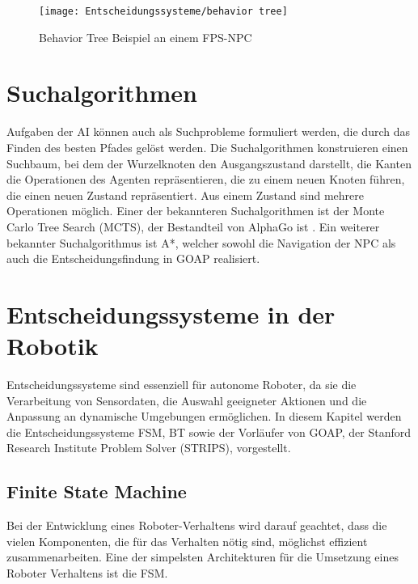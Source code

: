 \begin{figure}[h]
  \centering
  \texttt{[image: Entscheidungssysteme/behavior tree]}
	\captionsetup{justification=justified, format=plain}
  \caption{Behavior Tree Beispiel an einem FPS-NPC}
  \label{fig:ES BT}
\end{figure}


\section{Suchalgorithmen}
\label{chap:monte-carlo}

Aufgaben der AI k\"{o}nnen auch als Suchprobleme formuliert werden, die durch das Finden des besten Pfades gel\"{o}st werden. Die Suchalgorithmen konstruieren einen Suchbaum, bei dem der Wurzelknoten den Ausgangszustand darstellt, die Kanten die Operationen des Agenten repr\"{a}sentieren, die zu einem neuen Knoten f\"{u}hren, die einen neuen Zustand repr\"{a}sentiert. Aus einem Zustand sind mehrere Operationen m\"{o}glich. Einer der bekannteren Suchalgorithmen ist der Monte Carlo Tree Search (MCTS), der Bestandteil von AlphaGo ist \autocite{review_game_ai}. Ein weiterer bekannter Suchalgorithmus ist A*, welcher sowohl die Navigation der NPC als auch die Entscheidungsfindung in GOAP realisiert.

\section{Entscheidungssysteme in der Robotik}
\label{chap:robotik}

Entscheidungssysteme sind essenziell f\"{u}r autonome Roboter, da sie die Verarbeitung von Sensordaten, die Auswahl geeigneter Aktionen und die Anpassung an dynamische Umgebungen erm\"{o}glichen. In diesem Kapitel werden die Entscheidungssysteme FSM, BT sowie der Vorl\"{a}ufer von GOAP, der Stanford Research Institute Problem Solver (STRIPS), vorgestellt.

\subsection{Finite State Machine}
\label{chap:fsm robotik}

Bei der Entwicklung eines Roboter-Verhaltens wird darauf geachtet, dass die vielen Komponenten, die f\"{u}r das Verhalten n\"{o}tig sind, m\"{o}glichst effizient zusammenarbeiten. Eine der simpelsten Architekturen f\"{u}r die Umsetzung eines Roboter Verhaltens ist die FSM.

